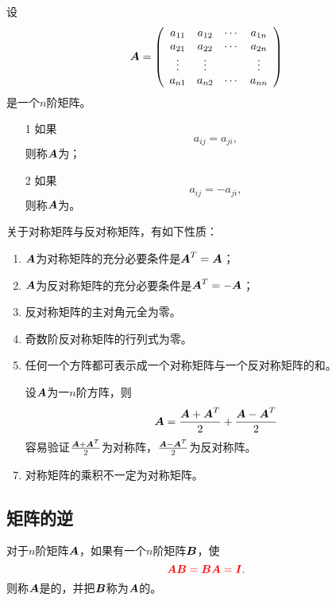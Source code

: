 \begin{frame}
\begin{dingyi}
  设
  $$
  \boldsymbol{A} = \left(
    \begin{array}{cccc}
      a_{11} & a_{12} & \cdots & a_{1n} \\
      a_{21} & a_{22} & \cdots & a_{2n} \\
      \vdots   & \vdots &  & \vdots \\
      a_{n1} & a_{n2} & \cdots & a_{nn} 
    \end{array}
  \right)
  $$
  是一个$n$阶矩阵。
  \begin{itemize}
  \item[1]
    如果
    $$
    a_{ij} = a_{ji},
    $$
    则称$\boldsymbol{A}$为；
  \item[2]
    如果
    $$
    a_{ij} = -a_{ji},
    $$
    则称$\boldsymbol{A}$为。
  \end{itemize}      
\end{dingyi}
\end{frame}

\begin{frame}
\begin{zhu*}
  关于对称矩阵与反对称矩阵，有如下性质：
  \begin{enumerate}
  \item $\boldsymbol{A}$为对称矩阵的充分必要条件是$\boldsymbol{A}^T=\boldsymbol{A}$；
  \item $\boldsymbol{A}$为反对称矩阵的充分必要条件是$\boldsymbol{A}^T=-\boldsymbol{A}$；
  \item 反对称矩阵的主对角元全为零。 
  \item 奇数阶反对称矩阵的行列式为零。
  \item 任何一个方阵都可表示成一个对称矩阵与一个反对称矩阵的和。
  \item[]  设$\boldsymbol{A}$为一$n$阶方阵，则
    $$
    \boldsymbol{A} = \frac{\boldsymbol{A}+\boldsymbol{A}^T}2 + \frac{\boldsymbol{A}-\boldsymbol{A}^T}2
    $$
    容易验证$\frac{\boldsymbol{A}+\boldsymbol{A}^T}2$为对称阵，$\frac{\boldsymbol{A}-\boldsymbol{A}^T}2$为反对称阵。 
  \item 对称矩阵的乘积不一定为对称矩阵。
  \item[]  
  \end{enumerate}
\end{zhu*}
\end{frame}


\subsection{矩阵的逆}
\begin{frame}
\begin{dingyi}[逆矩阵]
  对于$n$阶矩阵$\boldsymbol{A}$，如果有一个$n$阶矩阵$\boldsymbol{B}$，使
  $$
  \textcolor{red}{
    \boldsymbol{A}\boldsymbol{B} = \boldsymbol{B}\boldsymbol{A} = \boldsymbol{I}.
  }
  $$
  则称$\boldsymbol{A}$是的，并把$\boldsymbol{B}$称为$\boldsymbol{A}$的。
\end{dingyi}
\end{frame}

